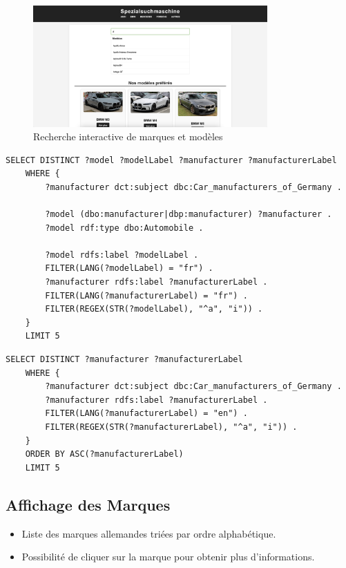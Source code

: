 \documentclass[a4paper]{article}
\begin{document}
\begin{figure}[H]
    \centering
    \includegraphics[width=0.8\textwidth]{images/recherche.png}
    \caption{Recherche interactive de marques et modèles}
\end{figure}

\begin{lstlisting}[language=SPARQL, caption=Requête SPARQL pour rechercher une marques allemandes]
    SELECT DISTINCT ?model ?modelLabel ?manufacturer ?manufacturerLabel
    WHERE {
        ?manufacturer dct:subject dbc:Car_manufacturers_of_Germany .
    
        ?model (dbo:manufacturer|dbp:manufacturer) ?manufacturer .
        ?model rdf:type dbo:Automobile .
    
        ?model rdfs:label ?modelLabel .
        FILTER(LANG(?modelLabel) = "fr") .
        ?manufacturer rdfs:label ?manufacturerLabel .
        FILTER(LANG(?manufacturerLabel) = "fr") .
        FILTER(REGEX(STR(?modelLabel), "^a", "i")) .
    }
    LIMIT 5
\end{lstlisting}

\begin{lstlisting}[language=SPARQL, caption=Requête SPARQL pour rechercher un modèle allemand]
    SELECT DISTINCT ?manufacturer ?manufacturerLabel 
    WHERE {
        ?manufacturer dct:subject dbc:Car_manufacturers_of_Germany .
        ?manufacturer rdfs:label ?manufacturerLabel .
        FILTER(LANG(?manufacturerLabel) = "en") .
        FILTER(REGEX(STR(?manufacturerLabel), "^a", "i")) .
    }
    ORDER BY ASC(?manufacturerLabel) 
    LIMIT 5
\end{lstlisting}

\subsection{Affichage des Marques}
\begin{itemize}
    \item Liste des marques allemandes triées par ordre alphabétique.
    \item Possibilité de cliquer sur la marque pour obtenir plus d'informations.
\end{itemize}
\end{document}
